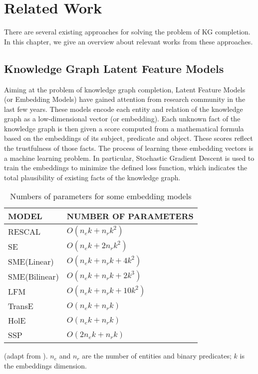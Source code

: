 

\chapter{Related Work}
\label{sec:related-work}
There are several existing approaches for solving the problem of KG completion. In this chapter, we give an overview about relevant works from these approaches.

\section{Knowledge Graph Latent Feature Models}
Aiming at the problem of knowledge graph completion, Latent Feature Models (or Embedding Models) have gained attention from research community in the last few years. These models encode each entity and relation of the knowledge graph as a low-dimensional vector (or embedding). Each unknown fact of the knowledge graph is then given a score computed from a mathematical formula based on the embeddings of its subject, predicate and object. These scores reflect the trustfulness of those facts. The process of learning these embedding vectors is a machine learning problem. In particular, Stochastic Gradient Descent is used to train the embeddings to minimize the defined loss function, which indicates the total plausibility of existing facts of the knowledge graph.

\begin{table}[t]
\centering
\begin{tabular}{ | l | l | } 
 \hline
 \textbf{MODEL} & \textbf{NUMBER OF PARAMETERS} \\ 
 \hline
 RESCAL\cite{conf/icml/NickelTK11} & $O(n_ek +n_rk^2)$    \\ 
 SE\cite{Bordes:2011:LSE:2900423.2900470} & $O(n_ek +2n_rk^2)$ \\ 
 SME(Linear)\cite{DBLP:journals/corr/abs-1301-3485} & $O(n_ek +n_rk +4k^2)$  \\ 
 SME(Bilinear)\cite{DBLP:journals/corr/abs-1301-3485} &  $O(n_ek +n_rk +2k^3)$ \\ 
 LFM \cite{Jenatton:2012:LFM:2999325.2999488} &  $O(n_ek +n_rk +10k^2)$ \\
 \hline
 TransE \cite{Bordes:NIPS2013} & $O(n_ek +n_rk)$  \\ 
 HolE\cite{DBLP:conf/aaai/NickelRP16} & $O(n_ek +n_rk)$  \\ 
 \hline
 SSP \cite{DBLP:conf/aaai/0005HMZ17} & $O(2n_ek +n_rk)$\\
 \hline
\end{tabular}
\caption{Numbers of parameters for some embedding models} (adapt from \cite{Bordes:NIPS2013}). $n_e$ and $n_r$ are the number of entities and binary predicates; $k$ is the embeddings dimension.
\label{table:embedding_recap}
\end{table}

